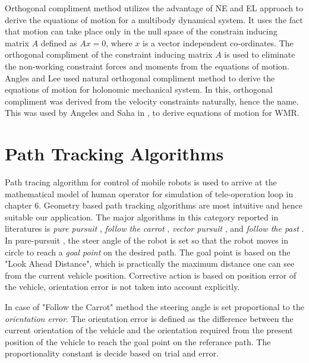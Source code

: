 Orthogonal compliment method utilizes the advantage of NE and EL approach to derive the equations of motion for a multibody dynamical system.  It uses the fact that motion can take place only in the null space of the constrain inducing matrix $A$ defined as $Ax=0$, where $x$ is a vector independent co-ordinates. The orthogonal compliment of the constraint inducing matrix $A$ is used to eliminate the non-working constraint  forces  and moments from the equations of motion.  Angles and Lee \cite{angeles1988formulation} used natural orthogonal compliment method to derive the equations of motion for holonomic mechanical system. In this,  orthogonal compliment was derived from the velocity constraints naturally, hence the name. This was  used by Angeles \cite{angeles2013fundamentals} and Saha in \cite{saha1989kinematics},\cite{saha1991dynamics} to derive equations of motion for WMR. 

\section{Path Tracking Algorithms}
Path tracing algorithm for control of mobile robots is used to arrive at the mathematical model of human operator for simulation of tele-operation loop in chapter 6. Geometry based path tracking algorithms are most intuitive and hence suitable our application. The major algorithms in this  category reported in literatures is  \textit{pure pursuit} \cite{coulter1992implementation}, \textit{follow the carrot} \cite{barton2001controller}, \textit{vector pursuit} \cite{wit2004autonomous}, and \textit{follow the past} \cite{hellstrom2006follow}. In pure-pursuit \cite{coulter1992implementation}, the steer angle of the robot is set so that the robot moves in circle to reach a \textit{ goal point} on the desired path. The goal point is based on the "Look Ahead Distance", which is practically the maximum distance one can see from the current vehicle position.  Corrective action is based on  position error of the vehicle,  orientation error is not taken into account explicitly. 

In case of "Follow the Carrot" method \cite{barton2001controller}  the steering angle is set proportional to the \textit{orientation error}. The orientation error is defined as the difference between the current orientation of the vehicle and the orientation required from the present position of the vehicle to reach the goal point on the referance path.  The proportionality constant is decide based on trial and error.

